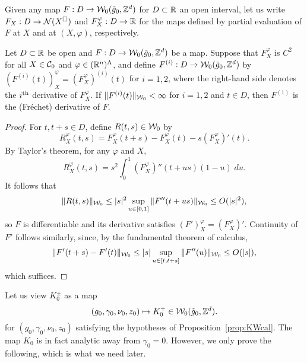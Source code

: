 Given any map $F : D \rightarrow \mathcal{W}_0(\tilde{g}_0, { {{\mathbb Z}}^d })$ for $D \subset {\mathbb R}$ an open interval,
let us write $F_X : D \rightarrow \mathcal{N}(X^\square)$ and $F^\varphi_X : D \rightarrow {\mathbb R}$ for the maps
defined by partial evaluation of $F$ at $X$ and at $(X, \varphi)$, respectively.

\begin{lemma}
\label{lem:smoothness}
Let $D \subset {\mathbb R}$ be open and $F : D \rightarrow \mathcal{W}_0(\tilde{g}_0, { {{\mathbb Z}}^d })$ be a map.
Suppose that $F^\varphi_X$ is $C^2$ for all $X \in \mathcal{C}_0$
and $\varphi \in ({\mathbb R}^n)^\Lambda$, and define 
$F^{(i)} : D \rightarrow \mathcal{W}_0(\tilde{g}_0, { {{\mathbb Z}}^d })$ by
$(F^{(i)}(t))^\varphi_X = (F^\varphi_X)^{(i)}(t)$ for $i = 1, 2$,
where the right-hand side denotes the
$i^{\rm th}$ derivative of $F^\varphi_X$.
If $\|F^{(i)}(t)\|_{\mathcal{W}_0} < \infty$ for $i = 1, 2$ and $t \in D$, then 
$F^{(1)}$ is the (Fr\'{e}chet) derivative of $F$.
\end{lemma}

\begin{proof}
For $t, t + s \in D$, define $R(t, s) \in \mathcal{W}_0$ by
\begin{equation}
R^\varphi_X(t, s) = F^\varphi_X(t + s) - F^\varphi_X(t) - s (F^\varphi_X)'(t).
\end{equation}
By Taylor's theorem, for any $\varphi$ and $X$,
\begin{equation}
R^\varphi_X(t, s) = s^2 \int_0^1 (F^\varphi_X)''(t + u s) (1 - u) \; du.
\end{equation}
It follows
that
\begin{equation}
\|R(t, s)\|_{\mathcal{W}_0}
  \le |s|^2 \sup_{u\in[0,1]} \|F''(t+us)\|_{\mathcal{W}_0}
  \le O(|s|^2),
\end{equation}
so $F$ is differentiable 
and its derivative satisfies $(F')^\varphi_X = (F^\varphi_X)'$.
Continuity of $F'$ follows similarly, since, by the
fundamental theorem of calculus,
\begin{equation}
\|F'(t+s) - F'(t)\|_{\mathcal{W}_0}
  \le
|s| \sup_{u\in[t,t+s]} \|F''(u)\|_{\mathcal{W}_0}
  \le
O(|s|),
\end{equation}
which suffices.
\end{proof}

Let us view $K^{\pm}_0$ as a map
\begin{equation}
(g_0, \gamma_0, \nu_0, z_0) \mapsto K^+_0 \in \mathcal{W}_0(\tilde{g}_0, { {{\mathbb Z}}^d }).
\end{equation}
for $(g_0, \gamma_0, \nu_0, z_0)$ satisfying the hypotheses
of Proposition~\ref{prop:KWcal}.
The map $K_0$ is in fact analytic away from $\gamma_0 = 0$.
However, we only prove the following, which is what we need later.

